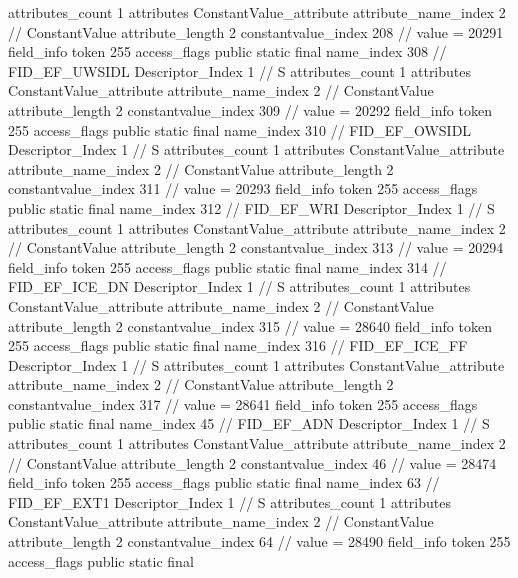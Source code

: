 {{{{{				attributes_count	1
				attributes {
				ConstantValue_attribute {
					attribute_name_index	2		// ConstantValue
					attribute_length	2
					constantvalue_index	208		// value = 20291
				}
				}
			}
			field_info {
				token	255
				access_flags	public static final
				name_index	308		// FID_EF_UWSIDL
				Descriptor_Index	1		// S
				attributes_count	1
				attributes {
				ConstantValue_attribute {
					attribute_name_index	2		// ConstantValue
					attribute_length	2
					constantvalue_index	309		// value = 20292
				}
				}
			}
			field_info {
				token	255
				access_flags	public static final
				name_index	310		// FID_EF_OWSIDL
				Descriptor_Index	1		// S
				attributes_count	1
				attributes {
				ConstantValue_attribute {
					attribute_name_index	2		// ConstantValue
					attribute_length	2
					constantvalue_index	311		// value = 20293
				}
				}
			}
			field_info {
				token	255
				access_flags	public static final
				name_index	312		// FID_EF_WRI
				Descriptor_Index	1		// S
				attributes_count	1
				attributes {
				ConstantValue_attribute {
					attribute_name_index	2		// ConstantValue
					attribute_length	2
					constantvalue_index	313		// value = 20294
				}
				}
			}
			field_info {
				token	255
				access_flags	public static final
				name_index	314		// FID_EF_ICE_DN
				Descriptor_Index	1		// S
				attributes_count	1
				attributes {
				ConstantValue_attribute {
					attribute_name_index	2		// ConstantValue
					attribute_length	2
					constantvalue_index	315		// value = 28640
				}
				}
			}
			field_info {
				token	255
				access_flags	public static final
				name_index	316		// FID_EF_ICE_FF
				Descriptor_Index	1		// S
				attributes_count	1
				attributes {
				ConstantValue_attribute {
					attribute_name_index	2		// ConstantValue
					attribute_length	2
					constantvalue_index	317		// value = 28641
				}
				}
			}
			field_info {
				token	255
				access_flags	public static final
				name_index	45		// FID_EF_ADN
				Descriptor_Index	1		// S
				attributes_count	1
				attributes {
				ConstantValue_attribute {
					attribute_name_index	2		// ConstantValue
					attribute_length	2
					constantvalue_index	46		// value = 28474
				}
				}
			}
			field_info {
				token	255
				access_flags	public static final
				name_index	63		// FID_EF_EXT1
				Descriptor_Index	1		// S
				attributes_count	1
				attributes {
				ConstantValue_attribute {
					attribute_name_index	2		// ConstantValue
					attribute_length	2
					constantvalue_index	64		// value = 28490
				}
				}
			}
			field_info {
				token	255
				access_flags	public static final
}}}}}
